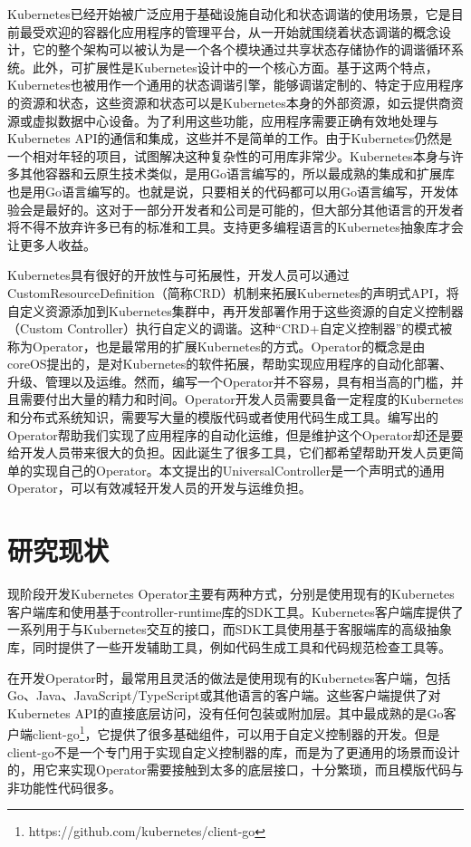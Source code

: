 \documentclass[macfonts,master]{njuthesis}
\begin{document}
Kubernetes已经开始被广泛应用于基础设施自动化和状态调谐的使用场景，它是目前最受欢迎的容器化应用程序的管理平台，从一开始就围绕着状态调谐的概念设计，它的整个架构可以被认为是一个各个模块通过共享状态存储协作的调谐循环系统。此外，可扩展性是Kubernetes设计中的一个核心方面。基于这两个特点，Kubernetes也被用作一个通用的状态调谐引擎，能够调谐定制的、特定于应用程序的资源和状态，这些资源和状态可以是Kubernetes本身的外部资源，如云提供商资源或虚拟数据中心设备。为了利用这些功能，应用程序需要正确有效地处理与Kubernetes API的通信和集成，这些并不是简单的工作。由于Kubernetes仍然是一个相对年轻的项目，试图解决这种复杂性的可用库非常少。Kubernetes本身与许多其他容器和云原生技术类似，是用Go语言编写的，所以最成熟的集成和扩展库也是用Go语言编写的。也就是说，只要相关的代码都可以用Go语言编写，开发体验会是最好的。这对于一部分开发者和公司是可能的，但大部分其他语言的开发者将不得不放弃许多已有的标准和工具。支持更多编程语言的Kubernetes抽象库才会让更多人收益。

Kubernetes具有很好的开放性与可拓展性，开发人员可以通过CustomResourceDefinition（简称CRD）机制来拓展Kubernetes的声明式API，将自定义资源添加到Kubernetes集群中，再开发部署作用于这些资源的自定义控制器（Custom Controller）执行自定义的调谐。这种``CRD+自定义控制器''的模式被称为Operator，也是最常用的扩展Kubernetes的方式。Operator的概念是由coreOS提出的，是对Kubernetes的软件拓展，帮助实现应用程序的自动化部署、升级、管理以及运维\cite{operators}。然而，编写一个Operator并不容易，具有相当高的门槛，并且需要付出大量的精力和时间。Operator开发人员需要具备一定程度的Kubernetes和分布式系统知识，需要写大量的模版代码或者使用代码生成工具。编写出的Operator帮助我们实现了应用程序的自动化运维，但是维护这个Operator却还是要给开发人员带来很大的负担\cite{problemofoperators}。因此诞生了很多工具，它们都希望帮助开发人员更简单的实现自己的Operator。本文提出的UniversalController是一个声明式的通用Operator，可以有效减轻开发人员的开发与运维负担。

\section{研究现状}

现阶段开发Kubernetes Operator主要有两种方式，分别是使用现有的Kubernetes客户端库和使用基于controller-runtime库的SDK工具。Kubernetes客户端库提供了一系列用于与Kubernetes交互的接口，而SDK工具使用基于客服端库的高级抽象库，同时提供了一些开发辅助工具，例如代码生成工具和代码规范检查工具等。

在开发Operator时，最常用且灵活的做法是使用现有的Kubernetes客户端，包括Go、Java、JavaScript/TypeScript或其他语言的客户端。这些客户端提供了对Kubernetes API的直接底层访问，没有任何包装或附加层。其中最成熟的是Go客户端client-go\footnote{https://github.com/kubernetes/client-go}，它提供了很多基础组件，可以用于自定义控制器的开发。但是client-go不是一个专门用于实现自定义控制器的库，而是为了更通用的场景而设计的，用它来实现Operator需要接触到太多的底层接口，十分繁琐，而且模版代码与非功能性代码很多。
\end{document}
